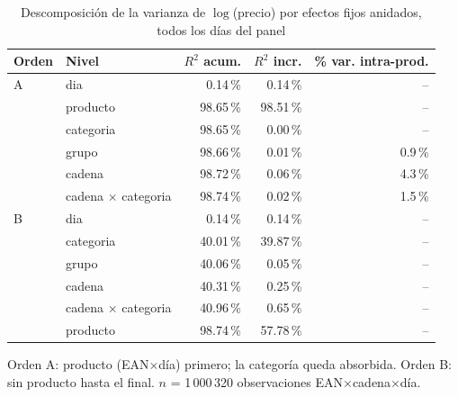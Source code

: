 \begin{table}[htbp]
\caption{Descomposici\'on de la varianza de $\log$(precio) por efectos fijos anidados, todos los d\'ias del panel}
\label{tab:varianza}
\centering\scriptsize\setlength{\tabcolsep}{3pt}
\begin{tabular}{@{}llrrr@{}}
\toprule
Orden & Nivel & $R^2$ acum. & $R^2$ incr. & \% var. intra-prod. \\
\midrule
A & dia & 0.14\,\% & 0.14\,\% & -- \\
 & producto & 98.65\,\% & 98.51\,\% & -- \\
 & categoria & 98.65\,\% & 0.00\,\% & -- \\
 & grupo & 98.66\,\% & 0.01\,\% & 0.9\,\% \\
 & cadena & 98.72\,\% & 0.06\,\% & 4.3\,\% \\
 & cadena $\times$ categoria & 98.74\,\% & 0.02\,\% & 1.5\,\% \\
\midrule
B & dia & 0.14\,\% & 0.14\,\% & -- \\
 & categoria & 40.01\,\% & 39.87\,\% & -- \\
 & grupo & 40.06\,\% & 0.05\,\% & -- \\
 & cadena & 40.31\,\% & 0.25\,\% & -- \\
 & cadena $\times$ categoria & 40.96\,\% & 0.65\,\% & -- \\
 & producto & 98.74\,\% & 57.78\,\% & -- \\
\bottomrule\end{tabular}
\par\smallskip\raggedright\scriptsize Orden A: producto (EAN$\times$d\'ia) primero; la categor\'ia queda absorbida. Orden B: sin producto hasta el final. $n$ = 1\,000\,320 observaciones EAN$\times$cadena$\times$d\'ia.
\end{table}
